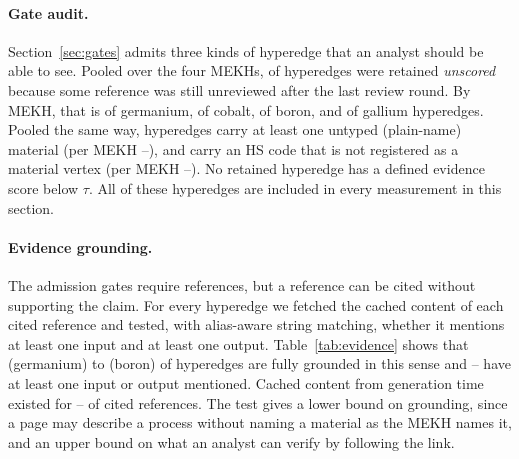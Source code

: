 \paragraph{Gate audit.}
Section~\ref{sec:gates} admits three kinds of hyperedge that an analyst should be able to see. Pooled over the four MEKHs, \MekhUnscoredAll{} of \MekhProcessesAll{} hyperedges were retained \emph{unscored} because some reference was still unreviewed after the last review round. By MEKH, that is \MekhUnscoredFracGermanium{} of germanium, \MekhUnscoredFracCobalt{} of cobalt, \MekhUnscoredFracBoron{} of boron, and \MekhUnscoredFracGallium{} of gallium hyperedges. Pooled the same way, \MekhUntypedEdgesAll{} hyperedges carry at least one untyped (plain-name) material (per MEKH \MekhUntypedEdgesMin{}--\MekhUntypedEdgesMax{}), and \MekhUnregisteredEdgesAll{} carry an HS code that is not registered as a material vertex (per MEKH \MekhUnregisteredEdgesMin{}--\MekhUnregisteredEdgesMax{}). No retained hyperedge has a defined evidence score below $\tau$. All of these hyperedges are included in every measurement in this section.

\paragraph{Evidence grounding.}
The admission gates require references, but a reference can be cited without supporting the claim. For every hyperedge we fetched the cached content of each cited reference and tested, with alias-aware string matching, whether it mentions at least one input and at least one output. Table~\ref{tab:evidence} shows that \EvidenceFullGermanium{} (germanium) to \EvidenceFullBoron{} (boron) of hyperedges are fully grounded in this sense and \EvidenceAnyMin{}--\EvidenceAnyMax{} have at least one input or output mentioned. Cached content from generation time existed for \EvidenceRefsFetchedMin{}--\EvidenceRefsFetchedMax{} of cited references. The test gives a lower bound on grounding, since a page may describe a process without naming a material as the MEKH names it, and an upper bound on what an analyst can verify by following the link.

